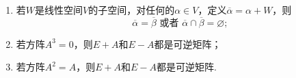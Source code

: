 \begin{enumerate}
\begin{enumerate}
        \item 若$W$是线性空间$V$的子空间，对任何的$\alpha\in V$，定义$\overline{\alpha}=\alpha+W$，则
        \[\overline{\alpha}=\overline{\beta}\text{~或者~}\overline{\alpha}\cap\overline{\beta}=\varnothing;\]

        \item 若方阵$A^3=0$，则$E+A$和$E-A$都是可逆矩阵；

        \item 若方阵$A^2=A$，则$E+A$和$E-A$都是可逆矩阵.
    \end{enumerate}
\end{enumerate}

\clearpage
